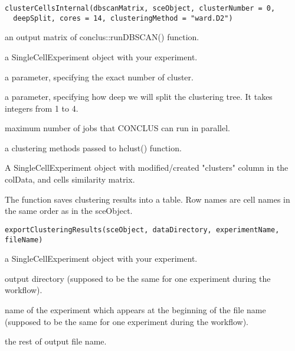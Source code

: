 \documentclass[a4paper]{book}
\begin{document}
%
\begin{Usage}
\begin{verbatim}
clusterCellsInternal(dbscanMatrix, sceObject, clusterNumber = 0,
  deepSplit, cores = 14, clusteringMethod = "ward.D2")
\end{verbatim}
\end{Usage}
%
\begin{Arguments}
\begin{ldescription}
\item[\code{dbscanMatrix}] an output matrix of conclus::runDBSCAN() function.

\item[\code{sceObject}] a SingleCellExperiment object with your experiment.

\item[\code{clusterNumber}] a parameter, specifying the exact number of cluster.

\item[\code{deepSplit}] a parameter, specifying how deep we will split the clustering tree. It takes integers from 1 to 4.

\item[\code{cores}] maximum number of jobs that CONCLUS can run in parallel.

\item[\code{clusteringMethod}] a clustering methods passed to hclust() function.
\end{ldescription}
\end{Arguments}
%
\begin{Value}
A SingleCellExperiment object with modified/created "clusters" column in the colData, and cells similarity matrix.
\end{Value}
%
\begin{Description}\relax
The function saves clustering results into a table. Row names are cell names in the same order as in the sceObject.
\end{Description}
%
\begin{Usage}
\begin{verbatim}
exportClusteringResults(sceObject, dataDirectory, experimentName, fileName)
\end{verbatim}
\end{Usage}
%
\begin{Arguments}
\begin{ldescription}
\item[\code{sceObject}] a SingleCellExperiment object with your experiment.

\item[\code{dataDirectory}] output directory (supposed to be the same for one experiment during the workflow).

\item[\code{experimentName}] name of the experiment which appears at the beginning of the file name 
(supposed to be the same for one experiment during the workflow).

\item[\code{fileName}] the rest of output file name.
\end{ldescription}
\end{Arguments}
\end{document}
